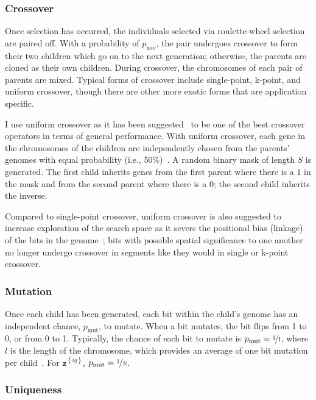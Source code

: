 \documentclass[12pt,dvipsnames]{report}
\begin{document}
\subsubsection{Crossover}

Once selection has occurred, the individuals selected via roulette-wheel selection are paired off.  With a probability of $p_{\text{xov}}$, the pair undergoes crossover to form their two children which go on to the next generation; otherwise, the parents are cloned as their own children.  During crossover, the chromosomes of each pair of parents are mixed.  Typical forms of crossover include single-point, k-point, and uniform crossover, though there are other more exotic forms that are application specific.

I use uniform crossover as it has been suggested~\cite{Picek:2011:ECO:2184629.2184665} to be one of the best crossover operators in terms of general performance.  With uniform crossover, each gene in the chromosomes of the children are independently chosen from the parents' genomes with equal probability (i.e., 50\%)~\cite{Syswerda:1989:UCG:645512.657265}.  A random binary mask of length $S$ is generated.  The first child inherits genes from the first parent where there is a $1$ in the mask and from the second parent where there is a $0$; the second child inherits the inverse.

Compared to single-point crossover, uniform crossover is also suggested to increase exploration of the search space as it severs the positional bias (linkage) of the bits in the genome~\cite{782011}; bits with possible spatial significance to one another no longer undergo crossover in segments like they would in single or k-point crossover.

\subsubsection{Mutation}

Once each child has been generated, each bit within the child's genome has an independent chance, $p_{\text{mut}}$, to mutate.  When a bit mutates, the bit flips from 1 to 0, or from 0 to 1.  Typically, the chance of each bit to mutate is $p_{\text{mut}} = \nicefrac{1}{l}$, where $l$ is the length of the chromosome, which provides an average of one bit mutation per child~\cite{GREENWELL19951,Deb2011}.  For $\textbf{z}^{\left\{ ig \right\}}$, $p_{\text{mut}} = \nicefrac{1}{S}$.

\subsubsection{Uniqueness}
\end{document}
